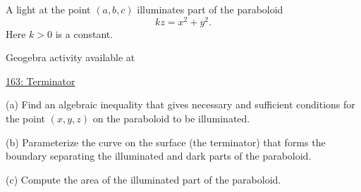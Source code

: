 \documentclass{ximera}
\begin{document}
\begin{question}  \label{Qweeregtt5}
A light at the point $(a,b,c)$ illuminates part of the paraboloid
\[
  k z = x^2 + y^2.
\]
Here $k>0$ is a constant.

 
\begin{onlineOnly}
    \begin{center}
\end{center}
\end{onlineOnly}

Geogebra activity available at

\href{https://www.geogebra.org/classic/nfkajvkp}{163: Terminator}



(a) Find an algebraic inequality that gives necessary and sufficient conditions for the point $(x,y,z)$ on the paraboloid to be illuminated.

(b) Parameterize the curve on the surface (the terminator) that forms the boundary separating the illuminated and dark parts of the paraboloid. 

(c) Compute the area of the illuminated part of the paraboloid.
\end{question}
\end{document}
